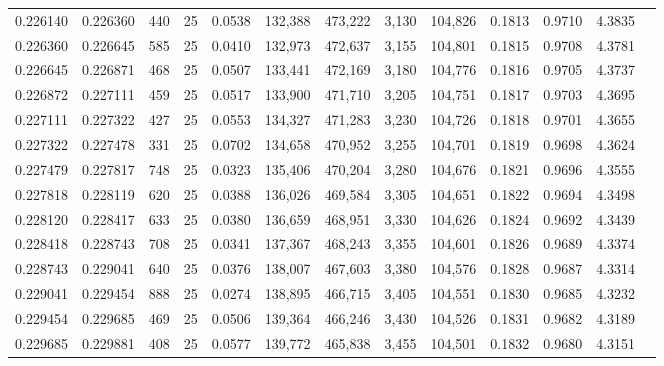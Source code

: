 \begin{tabular}{rrrrrrrrrrrrr}
0.226140 & 0.226360 &   440 &  25 &                                     0.0538 & 132,388 & 473,222 &   3,130 & 104,826 & 0.1813 & 0.9710 & 4.3835 \\
0.226360 & 0.226645 &   585 &  25 &                                     0.0410 & 132,973 & 472,637 &   3,155 & 104,801 & 0.1815 & 0.9708 & 4.3781 \\
0.226645 & 0.226871 &   468 &  25 &                                     0.0507 & 133,441 & 472,169 &   3,180 & 104,776 & 0.1816 & 0.9705 & 4.3737 \\
0.226872 & 0.227111 &   459 &  25 &                                     0.0517 & 133,900 & 471,710 &   3,205 & 104,751 & 0.1817 & 0.9703 & 4.3695 \\
0.227111 & 0.227322 &   427 &  25 &                                     0.0553 & 134,327 & 471,283 &   3,230 & 104,726 & 0.1818 & 0.9701 & 4.3655 \\
0.227322 & 0.227478 &   331 &  25 &                                     0.0702 & 134,658 & 470,952 &   3,255 & 104,701 & 0.1819 & 0.9698 & 4.3624 \\
0.227479 & 0.227817 &   748 &  25 &                                     0.0323 & 135,406 & 470,204 &   3,280 & 104,676 & 0.1821 & 0.9696 & 4.3555 \\
0.227818 & 0.228119 &   620 &  25 &                                     0.0388 & 136,026 & 469,584 &   3,305 & 104,651 & 0.1822 & 0.9694 & 4.3498 \\
0.228120 & 0.228417 &   633 &  25 &                                     0.0380 & 136,659 & 468,951 &   3,330 & 104,626 & 0.1824 & 0.9692 & 4.3439 \\
0.228418 & 0.228743 &   708 &  25 &                                     0.0341 & 137,367 & 468,243 &   3,355 & 104,601 & 0.1826 & 0.9689 & 4.3374 \\
0.228743 & 0.229041 &   640 &  25 &                                     0.0376 & 138,007 & 467,603 &   3,380 & 104,576 & 0.1828 & 0.9687 & 4.3314 \\
0.229041 & 0.229454 &   888 &  25 &                                     0.0274 & 138,895 & 466,715 &   3,405 & 104,551 & 0.1830 & 0.9685 & 4.3232 \\
0.229454 & 0.229685 &   469 &  25 &                                     0.0506 & 139,364 & 466,246 &   3,430 & 104,526 & 0.1831 & 0.9682 & 4.3189 \\
0.229685 & 0.229881 &   408 &  25 &                                     0.0577 & 139,772 & 465,838 &   3,455 & 104,501 & 0.1832 & 0.9680 & 4.3151 \\

\end{tabular}
